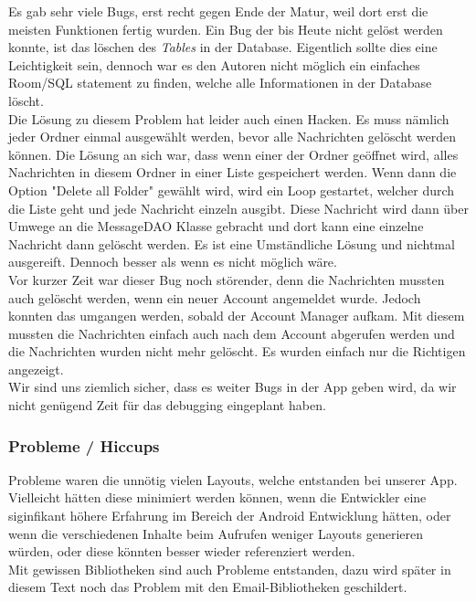 \documentclass[a4paper,11pt]{article}
\begin{document}
Es gab sehr viele Bugs, erst recht gegen Ende der Matur, weil dort erst die meisten Funktionen fertig wurden. 
Ein Bug der bis Heute nicht gelöst werden konnte, ist das löschen des \textit{Tables} in der Database. Eigentlich sollte dies eine
Leichtigkeit sein, dennoch war es den Autoren nicht möglich ein einfaches Room/SQL statement zu finden, welche alle Informationen in der Database löscht. \\

Die Lösung zu diesem Problem hat leider auch einen Hacken. Es muss nämlich jeder Ordner einmal ausgewählt werden, bevor alle Nachrichten gelöscht werden können. 
Die Lösung an sich war, dass wenn einer der Ordner geöffnet wird, alles Nachrichten in diesem Ordner in einer Liste gespeichert werden. Wenn dann die Option "Delete all Folder"
gewählt wird, wird ein Loop gestartet, welcher durch die Liste geht und jede Nachricht einzeln ausgibt. Diese Nachricht wird dann über Umwege an die MessageDAO Klasse gebracht
und dort kann eine einzelne Nachricht dann gelöscht werden. Es ist eine Umständliche Lösung und nichtmal ausgereift. Dennoch besser als wenn es nicht möglich wäre. \\

Vor kurzer Zeit war dieser Bug noch störender, denn die Nachrichten mussten auch gelöscht werden, wenn ein neuer Account angemeldet wurde. Jedoch 
konnten das umgangen werden, sobald der Account Manager aufkam. Mit diesem mussten die Nachrichten einfach auch nach dem Account abgerufen werden und die Nachrichten
wurden nicht mehr gelöscht. Es wurden einfach nur die Richtigen angezeigt. \\

Wir sind uns ziemlich sicher, dass es weiter Bugs in der App geben wird, da wir nicht genügend Zeit für das debugging eingeplant haben. 


\subsubsection{Probleme / Hiccups}
Probleme waren die unnötig vielen Layouts, welche entstanden bei unserer App. Vielleicht hätten diese minimiert werden können, wenn die Entwickler eine siginfikant höhere Erfahrung im Bereich der Android Entwicklung hätten, oder wenn die verschiedenen Inhalte beim Aufrufen weniger Layouts generieren würden, oder diese könnten besser wieder referenziert werden.\\

Mit gewissen Bibliotheken sind auch Probleme entstanden, dazu wird später in diesem Text noch das Problem mit den Email-Bibliotheken geschildert.
\end{document}
